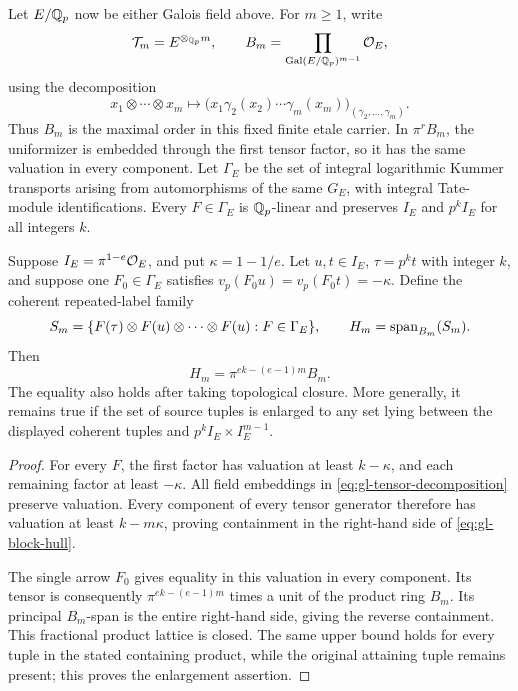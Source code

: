 Let $E/\mathbb Q_p$ now be either Galois field above. For $m\ge1$, write
\[
 \mathcal T_m=E^{\otimes_{\mathbb Q_p}m},\qquad
 B_m=\prod_{\operatorname{Gal}(E/\mathbb Q_p)^{m-1}}\mathcal O_E,
\]
using the decomposition
\begin{equation}\label{eq:gl-tensor-decomposition}
 x_1\otimes\cdots\otimes x_m\longmapsto
 \bigl(x_1\gamma_2(x_2)\cdots\gamma_m(x_m)\bigr)_
                {(\gamma_2,\ldots,\gamma_m)}.
\end{equation}
Thus $B_m$ is the maximal order in this fixed finite etale carrier.
In $\pi^rB_m$, the uniformizer is embedded through the first tensor
factor, so it has the same valuation in every component.
Let $\Gamma_E$ be the set of integral logarithmic Kummer transports
arising from automorphisms of the same $G_E$, with integral
Tate-module identifications. Every $F\in\Gamma_E$ is $\mathbb Q_p$-linear
and preserves $I_E$ and $p^kI_E$ for all integers $k$.

\begin{proposition}\label{prop:gl-block-hull}
Suppose $I_E=\pi^{1-e}\mathcal O_E$, and put $\kappa=1-1/e$.
Let $u,t\in I_E$, $\tau=p^kt$ with integer $k$, and suppose one
$F_0\in\Gamma_E$ satisfies $v_p(F_0u)=v_p(F_0t)=-\kappa$.
Define the coherent repeated-label family
\[
 S_m=\{F(\tau)\otimes F(u)\otimes\cdots\otimes F(u):
                      F\in\Gamma_E\},\qquad
 H_m=\operatorname{span}_{B_m}(S_m).
\]
Then
\begin{equation}\label{eq:gl-block-hull}
 H_m=\pi^{ek-(e-1)m}B_m.
\end{equation}
The equality also holds after taking topological closure. More
generally, it remains true if the set of source tuples is enlarged
to any set lying between the displayed coherent tuples and
$p^kI_E\times I_E^{m-1}$.
\end{proposition}
\begin{proof}
For every $F$, the first factor has valuation at least $k-\kappa$,
and each remaining factor at least $-\kappa$. All field embeddings
in \eqref{eq:gl-tensor-decomposition} preserve valuation. Every
component of every tensor generator therefore has valuation at least
$k-m\kappa$, proving containment in the right-hand side of
\eqref{eq:gl-block-hull}.

The single arrow $F_0$ gives equality in this valuation in every
component. Its tensor is consequently
$\pi^{ek-(e-1)m}$ times a unit of the product ring $B_m$.
Its principal $B_m$-span is the entire right-hand side, giving
the reverse containment. This fractional product lattice is
closed. The same upper bound holds for every tuple in the stated
containing product, while the original attaining tuple remains
present; this proves the enlargement assertion.
\end{proof}

